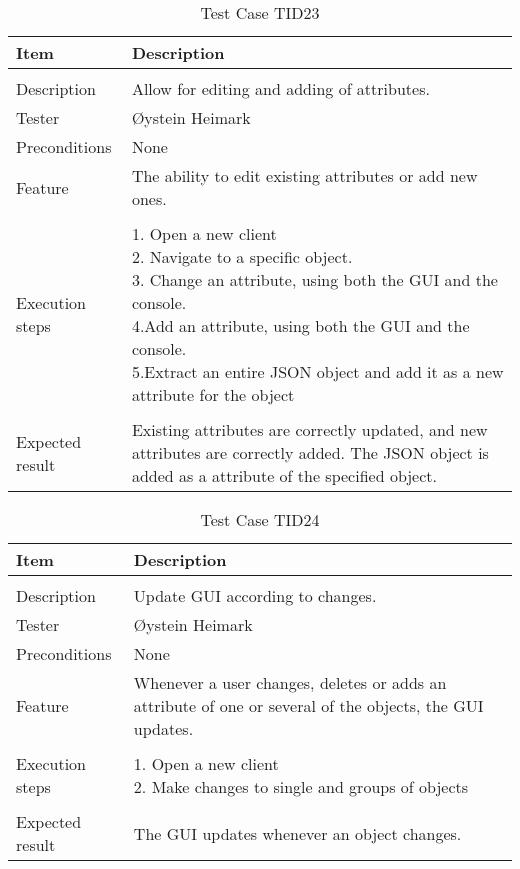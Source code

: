 \begin{table}[H]
\caption{Test Case TID23}
\centering
\begin{tabular}{ l p{13cm} }
\hline 
 Item            & Description        \\ 
\hline \\ [-2.0ex]
 Description     &Allow for editing and adding of attributes. \\ 
 Tester          & Øystein Heimark                  \\ 
 Preconditions   & None\\ 
 Feature         & The ability to edit existing attributes or add new ones.   \vspace{3pt}                     \\ 
\hline \\ [-1.5ex]
 Execution steps & \pbox{13cm}{1. Open a new client \\ 2. Navigate to a specific object. \\ 3. Change an attribute, using both the GUI and the console. \\ 4.Add an attribute, using both the GUI and the console. \\ 5.Extract an entire JSON object and add it as a new attribute for the object } \vspace{3pt} \\
\hline \\ [-1.5ex]
 Expected result & Existing attributes are correctly updated, and new attributes are correctly added. The JSON object is added as a attribute of the specified object. \\
\hline 
\end{tabular}
\label{table:testcasetid23}
\end{table}


\begin{table}[H]
\caption{Test Case TID24}
\centering
\begin{tabular}{ l p{13cm} }
\hline 
 Item            & Description        \\ 
\hline \\ [-2.0ex]
 Description     &Update GUI according to changes. \\ 
 Tester          & Øystein Heimark                  \\ 
 Preconditions   & None\\ 
 Feature         & Whenever a user changes, deletes or adds an attribute of one or several of the objects, the GUI updates.   \vspace{3pt}                     \\ 
\hline \\ [-1.5ex]
 Execution steps & \pbox{13cm}{1. Open a new client \\ 2. Make changes to single and groups of objects} \vspace{3pt} \\
\hline \\ [-1.5ex]
 Expected result & The GUI updates whenever an object changes. \\
\hline 
\end{tabular}
\label{table:testcasetid24}
\end{table}

